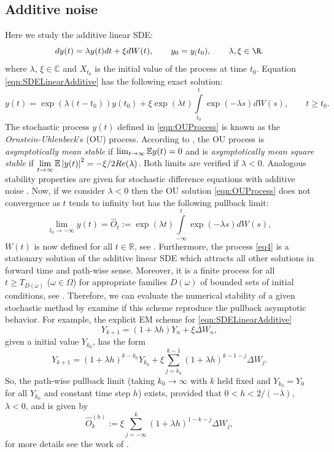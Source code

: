 	\subsection*{Additive noise}
	Here we study the additive linear SDE: 
	\begin{equation}\label{eqn:SDELinearAdditive}
		dy(t)=\lambda y(t)dt+ \xi  dW(t) , \qquad y_0=y_(t_0), \qquad \lambda, \xi \in \R.		
	\end{equation}
	where $\lambda$, $\xi \in \mathbb{C}$ and $X_{t_0}$ is the initial value of the process
	at time $t_0$. Equation \eqref{eqn:SDELinearAdditive}  has  the following  exact solution:
	\begin{equation}\label{eqn:OUProcess}
	y(t)=\exp(\lambda (t-t_0)) y(t_0)+\xi 
	\exp(\lambda t)\int\limits_{t_0}^{t}\exp(-\lambda s)dW(s), 
	\qquad t\geq t_0.
	\end{equation}
	The stochastic process $y(t)$ defined in \eqref{eqn:OUProcess} is known as 
	the {\it Ornstein-Uhlenbeck}'s (OU)  process. According to \cite{Hernandez1992},
	the OU process  is {\it asymptotically mean stable} if
	$ \lim_{t\to\infty}\mathbb{E}y(t)=0$ and is
	{\it  asymptotically  mean square stable} if
	$\displaystyle \lim_{t\to\infty}\mathbb{E}\left|y(t)\right|^2=-\xi/2Re(\lambda)$. Both 
	limits are verified if $\lambda<0$. 
	Analogous stability properties are given for 
	stochastic  difference equations with additive noise \cite{SaiotoPreprint}. 
	Now, if we consider $\lambda<0$ then the OU solution \eqref{eqn:OUProcess} does 
	not convergence as $t$ tends to infinity but has the following pullback limit:
	\begin{equation}\label{eq4}
		\lim_{t_0\to-\infty} y(t)=\widehat{O}_t:=
		\exp(\lambda t)\int\limits_{-\infty}^{t}\exp(-\lambda s)dW(s), 
	\end{equation}
	$W(t)$  is now defined for all $t\in\mathbb{R}$, see
	\cite{Arnold1998, kloeden1999towards}. Furthermore, the process \eqref{eq4} is a
	stationary solution  of the additive linear SDE which attracts all other solutions in
	forward time and path-wise sense. Moreover, it is a finite process for all $t\geq
	T_{D(\omega)}$ ($\omega\in \Omega$) for  appropriate families $D(\omega)$ of bounded
	sets of initial conditions, see \cite{Robinson2002}. Therefore, 
	we can evaluate the numerical stability of a given stochastic method by examine if 
	this scheme reproduce the pullback asymptotic behavior.
	For example, the explicit EM scheme for \eqref{eqn:SDELinearAdditive}
	$$
		Y_{k+1} = (1+\lambda h) Y_n + \xi \Delta W_n,	
	$$
	given a initial value $Y_{k_0}$, has the form
	$$
		Y_{k+1} = (1+\lambda h)^{k-k_0} Y_{k_0}
			+\xi \sum_{j=k_0}^{k-1} (1+\lambda h)^{k-1-j} \Delta W_j.
	$$
	So, the path-wise pullback limit (taking $k_0 \to \infty$  with $k$ held fixed and $Y_{k_0} = Y_0$ for
	all $Y_{k_0}$ and constant time step $h$) exists, provided that $0 <h< 2/(- \lambda)$, $\lambda <0$, and is given
	by
	$$
		\widehat{O}_k^{(h)} := 
			\xi \sum_{j= -\infty}^k
				(1+\lambda h)^{1-k-j} \Delta W_j,
	$$
	for more details see the work of
	\citet*{Buckwar2011a}.
	

